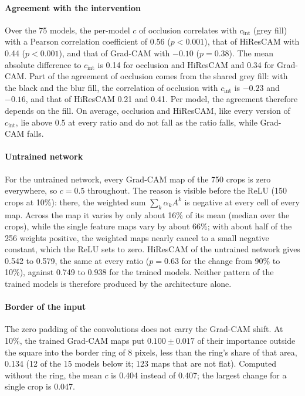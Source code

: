 \paragraph{Agreement with the intervention}
Over the 75 models, the per-model $c$ of occlusion correlates with $c_{\mathrm{int}}$
(grey fill) with a Pearson correlation coefficient of 0.56 ($p < 0.001$), that of
HiResCAM with 0.44 ($p < 0.001$), and that of Grad-CAM with $-0.10$ ($p = 0.38$). The
mean absolute difference to $c_{\mathrm{int}}$ is 0.14 for occlusion and HiResCAM and
0.34 for Grad-CAM. Part of the agreement of occlusion comes from the shared grey fill:
with the black and the blur fill, the correlation of occlusion with $c_{\mathrm{int}}$
is $-0.23$ and $-0.16$, and that of HiResCAM 0.21 and 0.41. Per model, the agreement
therefore depends on the fill. On average, occlusion and HiResCAM, like every version of
$c_{\mathrm{int}}$, lie above 0.5 at every ratio and do not fall as the ratio falls,
while Grad-CAM falls.

\paragraph{Untrained network}
For the untrained network, every Grad-CAM map of the 750 crops is zero everywhere, so
$c = 0.5$ throughout. The reason is visible before the ReLU (150 crops at 10\%): there,
the weighted sum $\sum_k \alpha_k A^k$ is negative at every cell of every map. Across
the map it varies by only about 16\% of its mean (median over the crops), while the
single feature maps vary by about 66\%; with about half of the 256 weights positive, the
weighted maps nearly cancel to a small negative constant, which the ReLU sets to zero.
HiResCAM of the untrained network gives 0.542 to 0.579, the same at
every ratio ($p = 0.63$ for the change from 90\% to 10\%), against 0.749 to 0.938 for the
trained models. Neither pattern of the trained models is therefore produced by the
architecture alone.

\paragraph{Border of the input}
The zero padding of the convolutions does not carry the Grad-CAM shift. At 10\%, the
trained Grad-CAM maps put $0.100 \pm 0.017$ of their importance outside the square into
the border ring of 8 pixels, less than the ring's share of that area, 0.134 (12 of
the 15 models below it; 123 maps that are not flat). Computed without the ring, the mean
$c$ is 0.404 instead of 0.407; the largest change for a single crop is 0.047.

